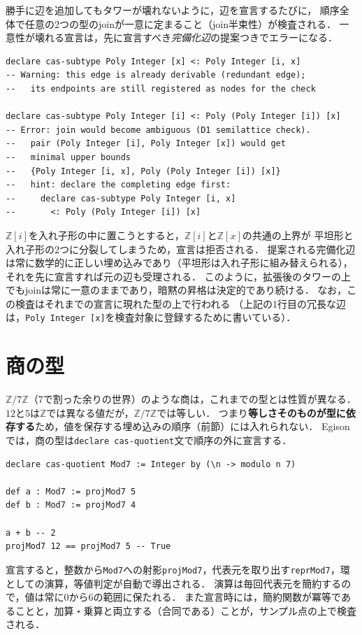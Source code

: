 勝手に辺を追加してもタワーが壊れないように，辺を宣言するたびに，
順序全体で任意の2つの型のjoinが一意に定まること（join半束性）が検査される．
一意性が壊れる宣言は，先に宣言すべき\emph{完備化辺}の提案つきでエラーになる．
\begin{lstlisting}[language=egison,numbers=none]
declare cas-subtype Poly Integer [x] <: Poly Integer [i, x]
-- Warning: this edge is already derivable (redundant edge);
--   its endpoints are still registered as nodes for the check

declare cas-subtype Poly Integer [i] <: Poly (Poly Integer [i]) [x]
-- Error: join would become ambiguous (D1 semilattice check).
--   pair (Poly Integer [i], Poly Integer [x]) would get
--   minimal upper bounds
--   {Poly Integer [i, x], Poly (Poly Integer [i]) [x]}
--   hint: declare the completing edge first:
--     declare cas-subtype Poly Integer [i, x]
--       <: Poly (Poly Integer [i]) [x]
\end{lstlisting}
$\mathbb{Z}[i]$を入れ子形の中に置こうとすると，$\mathbb{Z}[i]$と$\mathbb{Z}[x]$の共通の上界が
平坦形と入れ子形の2つに分裂してしまうため，宣言は拒否される．
提案される完備化辺は常に数学的に正しい埋め込みであり（平坦形は入れ子形に組み替えられる），
それを先に宣言すれば元の辺も受理される．
このように，拡張後のタワーの上でもjoinは常に一意のままであり，暗黙の昇格は決定的であり続ける．
なお，この検査はそれまでの宣言に現れた型の上で行われる
（上記の1行目の冗長な辺は，\lstinline{Poly Integer [x]}を検査対象に登録するために書いている）．

\section{商の型}\label{cas-quotient}

$\mathbb{Z}/7\mathbb{Z}$（7で割った余りの世界）のような商は，これまでの型とは性質が異なる．
$12$と$5$は$\mathbb{Z}$では異なる値だが，$\mathbb{Z}/7\mathbb{Z}$では等しい．
つまり\textbf{等しさそのものが型に依存する}ため，値を保存する埋め込みの順序（前節）には入れられない．
Egisonでは，商の型は\lstinline{declare cas-quotient}文で順序の外に宣言する．
\begin{lstlisting}[language=egison,numbers=none]
declare cas-quotient Mod7 := Integer by (\n -> modulo n 7)

def a : Mod7 := projMod7 5
def b : Mod7 := projMod7 4

a + b -- 2
projMod7 12 == projMod7 5 -- True
\end{lstlisting}
宣言すると，整数から\lstinline{Mod7}への射影\lstinline{projMod7}，代表元を取り出す\lstinline{reprMod7}，環としての演算，等値判定が自動で導出される．
演算は毎回代表元を簡約するので，値は常に$0$から$6$の範囲に保たれる．
また宣言時には，簡約関数が冪等であることと，加算・乗算と両立する（合同である）ことが，サンプル点の上で検査される．

